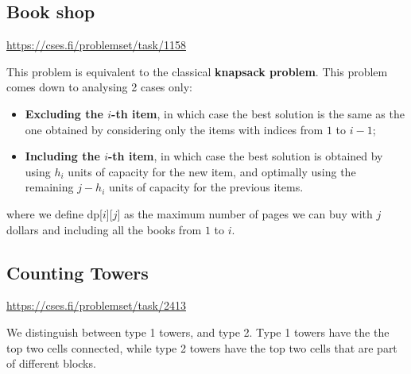 \subsection{Book shop}
\begin{sloppypar}
\url{https://cses.fi/problemset/task/1158}
\end{sloppypar}

This problem is equivalent to the classical \textbf{knapsack problem}. This problem comes down to analysing 2 cases only:
\\
\begin{itemize}
    \item \textbf{Excluding the $i$-th item}, in which case the best solution is the same as the one obtained by considering only the items with indices from $1$ to $i - 1$;
    
    \item \textbf{Including the $i$-th item}, in which case the best solution is obtained by using $h_i$ units of capacity for the new item, and optimally using the remaining $j - h_i$ units of capacity for the previous items.
\end{itemize}


\begin{center}
\end{center}

where we define dp[$i$][$j$] as the maximum number of pages we can buy with $j$ dollars and including all the books from $1$ to $i$.


\subsection{Counting Towers}
\begin{sloppypar}
\url{https://cses.fi/problemset/task/2413}
\end{sloppypar}

We distinguish between type 1 towers, and type 2. Type 1 towers have the the top two cells connected, while type 2 towers have the top two cells that are part of different blocks.

